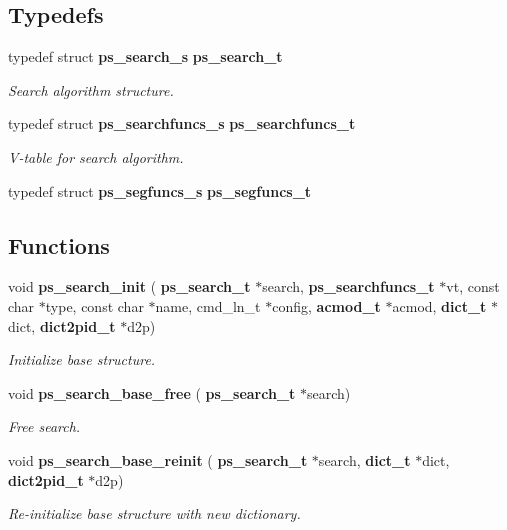 \subsection*{Typedefs}
\begin{DoxyCompactItemize}
\item 
\mbox{\label{pocketsphinx__internal_8h_adc3de4d62e46c5e6cb93d09fb61be8ee}} 
typedef struct \textbf{ ps\+\_\+search\+\_\+s} \textbf{ ps\+\_\+search\+\_\+t}
\begin{DoxyCompactList}\small\item\em Search algorithm structure. \end{DoxyCompactList}\item 
\mbox{\label{pocketsphinx__internal_8h_a0eae078e32bd5f339792884c68aad8b3}} 
typedef struct \textbf{ ps\+\_\+searchfuncs\+\_\+s} \textbf{ ps\+\_\+searchfuncs\+\_\+t}
\begin{DoxyCompactList}\small\item\em V-\/table for search algorithm. \end{DoxyCompactList}\item 
\mbox{\label{pocketsphinx__internal_8h_a08187b85c6bc5b4991632dc78e237977}} 
typedef struct \textbf{ ps\+\_\+segfuncs\+\_\+s} {\bfseries ps\+\_\+segfuncs\+\_\+t}
\end{DoxyCompactItemize}
\subsection*{Functions}
\begin{DoxyCompactItemize}
\item 
\mbox{\label{pocketsphinx__internal_8h_a9e0d66662ea7c64f8bddbbfe57496896}} 
void \textbf{ ps\+\_\+search\+\_\+init} (\textbf{ ps\+\_\+search\+\_\+t} $\ast$search, \textbf{ ps\+\_\+searchfuncs\+\_\+t} $\ast$vt, const char $\ast$type, const char $\ast$name, cmd\+\_\+ln\+\_\+t $\ast$config, \textbf{ acmod\+\_\+t} $\ast$acmod, \textbf{ dict\+\_\+t} $\ast$dict, \textbf{ dict2pid\+\_\+t} $\ast$d2p)
\begin{DoxyCompactList}\small\item\em Initialize base structure. \end{DoxyCompactList}\item 
\mbox{\label{pocketsphinx__internal_8h_a39db3228c813a2943d47ff3f13e6ef08}} 
void \textbf{ ps\+\_\+search\+\_\+base\+\_\+free} (\textbf{ ps\+\_\+search\+\_\+t} $\ast$search)
\begin{DoxyCompactList}\small\item\em Free search. \end{DoxyCompactList}\item 
\mbox{\label{pocketsphinx__internal_8h_a307801961f27bd5f4b82a3e6b83e0ca1}} 
void \textbf{ ps\+\_\+search\+\_\+base\+\_\+reinit} (\textbf{ ps\+\_\+search\+\_\+t} $\ast$search, \textbf{ dict\+\_\+t} $\ast$dict, \textbf{ dict2pid\+\_\+t} $\ast$d2p)
\begin{DoxyCompactList}\small\item\em Re-\/initialize base structure with new dictionary. \end{DoxyCompactList}\end{DoxyCompactItemize}


